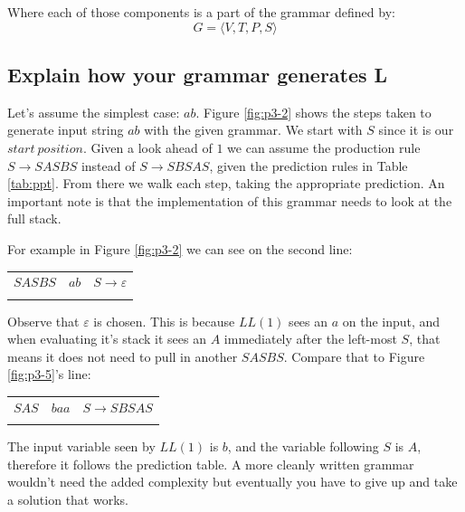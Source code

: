 \documentclass{article}
\begin{document}
\noindent Where each of those components is a part of the grammar defined by:
\begin{equation}
G = \langle V, T, P, S \rangle
\end{equation}

\subsection[Generation Explanation]{Explain how your grammar generates L}
Let's assume the simplest case: $ab$. Figure \ref{fig:p3-2} shows the steps 
taken to generate input string $ab$ with the given grammar. We start with $S$ 
since it is our $start\ position$. Given a look ahead of $1$ we can assume the 
production rule $S \to SASBS$ instead of $S \to SBSAS$, given the prediction 
rules in Table \ref{tab:ppt}. From there we walk each step, taking the 
appropriate prediction. An important note is that the implementation of this 
grammar needs to look at the full stack. 

For example in Figure \ref{fig:p3-2} we can see on the second line:\\

\begin{tabular}{lll}
$SASBS$ & $ab$ & $S \to \varepsilon$ \\\\
\end{tabular}



Observe that $\varepsilon$ is chosen. This is because $LL(1)$ sees an $a$ on the 
input, and when evaluating it's stack it sees an $A$ immediately after the 
left-most $S$, that means it does not need to pull in another $SASBS$. Compare 
that to Figure \ref{fig:p3-5}'s line:\\

\begin{tabular}{lll}
$SAS$ & $baa$ & $S \to SBSAS$ \\\\
\end{tabular}

The input variable seen by $LL(1)$ is $b$, and the variable following $S$ is $A$, 
therefore it follows the prediction table. A more cleanly written grammar 
wouldn't need the added complexity but eventually you have to give up and take 
a solution that works.
\end{document}
